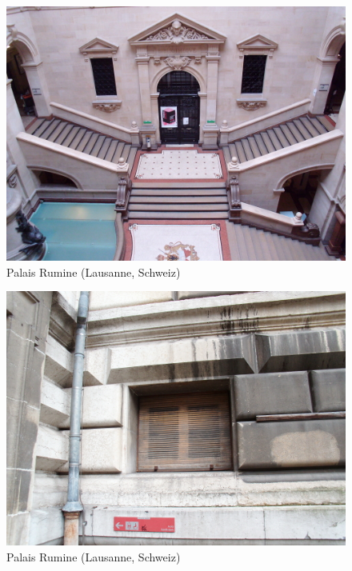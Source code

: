 \documentclass[a4paper,
fontsize=11pt,
oneside,
numbers=noperiodatend,
parskip=half-,
bibliography=totoc,
final
]{scrartcl}
\begin{document}
\begin{figure}[htbp]
\centering
\includegraphics{./img/014.jpg}
\caption{Palais Rumine (Lausanne,
Schweiz)}
\end{figure}

\begin{figure}[htbp]
\centering
\includegraphics{./img/015.jpg}
\caption{Palais Rumine (Lausanne,
Schweiz)}
\end{figure}
\end{document}

